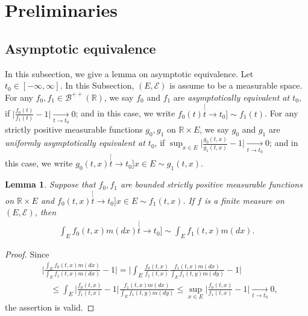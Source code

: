 \documentclass[12pt,a4paper]{amsart}
\newtheorem{lem}[thm]{Lemma}
\theoremstyle{definition}
\numberwithin{equation}{section}
\begin{document}
\section{Preliminaries} \label{sec: Preliminaries}
\subsection{Asymptotic equivalence} \label{sec: Asymptotic equivalence}
In this subsection, we give a lemma on asymptotic equivalence.	
Let $t_0 \in [-\infty,\infty]$.
In this Subsection, $(E, \mathscr E)$ is assume to be a  measurable space.
For any $f_0, f_1\in \mathscr B^{++}({\mathbb R})$, we say $f_0$ and $f_1$ are \emph{asymptotically equivalent at $t_0$}, if $\big|\frac{f_0(t)}{f_1(t)} - 1\big| \xrightarrow[t\to t_0]{} 0$;
and in this case, we write $f_0(t) \stackrel[t\to t_0]{}{\sim} f_1(t)$.
For any strictly positive measurable functions $g_0, g_1$ on $\mathbb R\times E$, 
we say $g_0$ and $g_1$ are \emph{uniformly asymptotically equivalent at $t_0$}, if $\sup_{x\in E}\big|\frac{g_0(t,x)}{g_1(t,x)} - 1\big| \xrightarrow[t\to t_0]{} 0$; and in this case, we write $g_0(t,x)\stackrel[t\to t_0]{x\in E}{\sim}g_1(t,x)$.

\begin{lem} \label{lem: asymptotic equivalent of integration}
	Suppose that 
$f_0,f_1$ are bounded strictly positive measurable functions on $\mathbb R \times E$
	and $f_0(t,x)\stackrel[t\to t_0]{x\in E}{\sim}f_1(t,x)$.
If $f$ is a finite measure on $(E, \mathscr E)$, then
  \begin{align}
    \int_E f_0(t,x)m(dx)
    \stackrel[t\to t_0]{}{\sim}
    \int_E f_1(t,x)m(dx).
  \end{align}
\end{lem}
\begin{proof}
	Since
\begin{align}
	&\Big| \frac{	\int_E f_0(t,x)m(dx) }{ 	\int_E f_1(t,x)m(dx)  } - 1 \Big|
   = \Big| \int_E \frac{f_0(t,x)}{f_1(t,x)} \frac{f_1(t,x)m(dx)}{	\int_E f_1(t,y)m(dy)  } - 1\Big|
	\\&\quad \leq \int_E \Big|  \frac{f_0(t,x)}{f_1(t,x)} - 1 \Big| \frac{f_1(t,x)m(dx)}{	\int_E f_1(t,y)m(dy)  }
	\leq \sup_{x\in E} \Big|  \frac{f_0(t,x)}{f_1(t,x)} - 1 \Big|
	\xrightarrow[t\to t_0]{} 0,
\end{align}
the assertion is valid.
\end{proof}
\end{document}
